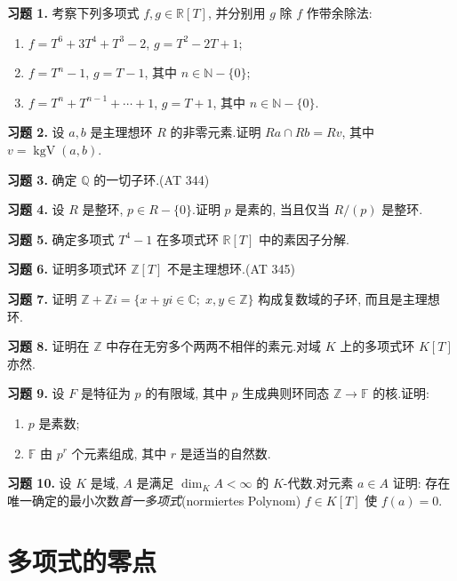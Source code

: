 \aufgaben

\noindent\textbf{习题 1.} 考察下列多项式 $f, g \in \mathbb{R}[T]$, 并分别用 $g$ 除 $f$ 作带余除法:
\begin{enumerate}
\item[(i)] $f = T^6 + 3T^4 + T^3 - 2$, $g = T^2 - 2T + 1$;
\item[(ii)] $f = T^n - 1$, $g = T - 1$, 其中 $n \in \mathbb{N} - \{0\}$;
\item[(iii)] $f = T^n + T^{n - 1} + \cdots + 1$, $g = T + 1$, 其中 $n \in \mathbb{N} - \{0\}$.
\end{enumerate}

\medskip
\noindent\textbf{习题 2.} 设 $a, b$ 是主理想环 $R$ 的非零元素.证明 $Ra \cap Rb = Rv$, 其中 $v = \operatorname{kgV}(a, b)$.

\medskip
\noindent\textbf{习题 3.} 确定 $\mathbb{Q}$ 的一切子环.(AT 344)

\medskip
\noindent\textbf{习题 4.} 设 $R$ 是整环, $p \in R - \{0\}$.证明 $p$ 是素的, 当且仅当 $R/(p)$ 是整环.

\medskip
\noindent\textbf{习题 5.} 确定多项式 $T^4 - 1$ 在多项式环 $\mathbb{R}[T]$ 中的素因子分解.

\medskip
\noindent\textbf{习题 6.} 证明多项式环 $\mathbb{Z}[T]$ 不是主理想环.(AT 345)

\medskip
\noindent\textbf{习题 7.} 证明 $\mathbb{Z} + \mathbb{Z}i = \{x + yi \in \mathbb{C};\; x, y \in \mathbb{Z}\}$ 构成复数域的子环, 而且是主理想环.

\medskip
\noindent\textbf{习题 8.} 证明在 $\mathbb{Z}$ 中存在无穷多个两两不相伴的素元.对域 $K$ 上的多项式环 $K[T]$ 亦然.

\medskip
\noindent\textbf{习题 9.} 设 $F$ 是特征为 $p$ 的有限域, 其中 $p$ 生成典则环同态 $\mathbb{Z} \longrightarrow \mathbb{F}$ 的核.证明:
\begin{enumerate}
\item[(i)] $p$ 是素数;
\item[(ii)] $\mathbb{F}$ 由 $p^r$ 个元素组成, 其中 $r$ 是适当的自然数.
\end{enumerate}

\medskip
\noindent\textbf{习题 10.} 设 $K$ 是域, $A$ 是满足 $\dim_K A < \infty$ 的 $K$-代数.对元素 $a \in A$ 证明: 存在唯一确定的最小次数\emph{首一多项式}(\textup{normiertes Polynom}) $f \in K[T]$ 使 $f(a) = 0$.

\section{多项式的零点}\label{sec:5.3}

